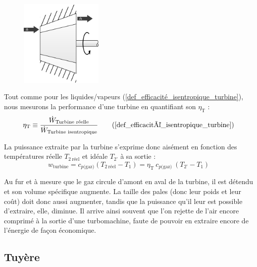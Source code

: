 		\begin{figure}
			\begin{center}
				\includegraphics[width=4cm]{images/symbole_turbine.png}
			\end{center}
			\label{fig_illustration_turbine2}
		\end{figure}

		Tout comme pour les liquides/vapeurs (\ref{def_efficacité_isentropique_turbine}), nous mesurons la performance d’une turbine en quantifiant son  $\eta_\text{T}$ :
		\begin{equation}
			\eta_\text{T} \equiv \frac{\dot W_\text{Turbine réelle}}{\dot W_\text{Turbine isentropique}}	  \tag{\ref{def_efficacité_isentropique_turbine}}
		\end{equation}

		La puissance extraite par la turbine s’exprime donc aisément en fonction des températures réelle $T_{2~\text{réel}}$ et idéale $T_{2’}$ à sa sortie :
		\begin{equation}
			w_\text{turbine} = c_{p \text{(gaz)}} (T_{2~\text{réel}} - T_1) =  \eta_\text{T} \ c_{p \text{(gaz)}} \ (T_{2’} - T_1)
			\label{eq_puissance_turbine_gaz}
		\end{equation}

		Au fur et à mesure que le gaz circule d’amont en aval de la turbine, il est détendu et son volume spécifique augmente. La taille des pales (donc leur poids et leur coût) doit donc aussi augmenter, tandis que la puissance qu’il leur est possible d’extraire, elle, diminue. Il arrive ainsi souvent que l’on rejette de l’air encore comprimé à la sortie d’une turbomachine, faute de pouvoir en extraire encore de l’énergie de façon économique.


	\subsection{Tuyère}

